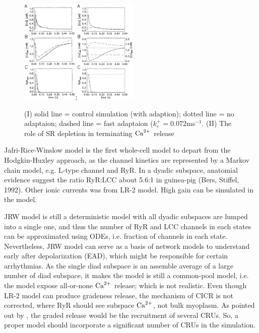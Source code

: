 \begin{figure}[hbt]
  \centerline{\includegraphics[height=5cm]{./images/Jafri1998_Fig6.eps};\includegraphics[height=5cm]{./images/Jafri1998_Fig7.eps}}
  \caption{(I) solid line = control simulation (with adaption); dotted line = no
  adaptaion; dashed line = fast adaptaion ($k_c^+=0.072$ms$^{-1}$.
  (II) The role of SR depletion in terminating ${\text{Ca}^{2+}}$ release}
  \label{fig:Jafri1998_Fig6.7}
\end{figure}



Jafri-Rice-Winslow model is the first whole-cell model to depart from
the Hodgkin-Huxley approach, as the channel kinetics are represented
by a Markov chain model, e.g. L-type channel and RyR. In a dyadic
subspace, anatomial evidence suggest the ratio RyR:LCC about 5.6:1 in
guinea-pig (Bers, Stiffel, 1992). Other ionic currents was from LR-2 model.
High gain can be simulated in the model. 
  
JRW model is still a deterministic model with all dyadic  subspaces are lumped
into a single one, and thus the number of RyR and LCC channels in each states
can be approximated using ODEs, i.e. fraction of channels in each state.
Nevertheless, JRW model can serve as a basis of network models to understand
early after depolarization (EAD), which might be responsible for certain
arrhythmias.
As the single diad subspace is an assemble average of a large number of diad
subspace, it makes the model is still a common-pool model, i.e. the model expose
all-or-none ${\text{Ca}^{2+}}$ release; which is not realistic. Even though LR-2 model can
produce gradeness release, the mechanism of CICR is not corrected, where RyR
should see subspace ${\text{Ca}^{2+}}$, not bulk myoplasm.
As pointed out by \citep{stern1992tec}, the graded release would be the
recruitment of several CRUs. So, a proper model should incorporate a significant
number of CRUs in the simulation.


